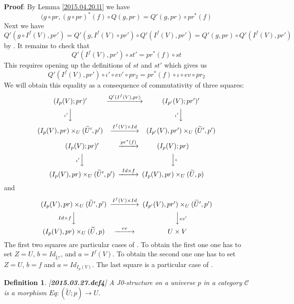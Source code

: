 \documentclass[12pt]{article}
\newenvironment{myproof}{{\bf Proof}:}{\vskip 5mm }
\newtheorem{definition}[proposition]{Definition}
\newcommand{\llabel}[1]{\label{#1}[{\bf #1}]}
\newcommand{\sr}{\rightarrow}
\newcommand{\wt}{\widetilde}
\begin{document}
\begin{myproof}
By Lemma \ref{2015.04.20.l1} we have 
%
$$(g\circ pr, (g\circ pr)^*(f)\circ Q(g,pr)=Q'(g,pr)\circ pr^*(f)$$
%
Next we have
%
$$Q'(g\circ I^f(V), pr')=Q'(g,I^f(V)\circ pr')\circ Q'(I^f(V),pr')=Q'(g,pr)\circ Q'(I^f(V),pr')$$
%
by \cite[Lemma 2.5]{Cfromauniverse}. It remains to check that
%
$$Q'(I^f(V),pr')\circ st'=pr^*(f)\circ st$$
%
This requires opening up the definitions of $st$ and $st'$ which gives us
%
$$Q'(I^f(V),pr')\circ \iota'\circ ev'\circ pr_2=pr^*(f)\circ \iota\circ ev\circ pr_2$$
%
We will obtain this equality as a consequence of commutativity of three squares:
%
$$
\begin{CD}
(I_p(V);pr)' @>Q'(I^f(V),pr)>> (I_{p'}(V);pr')'\\
@V\iota' VV @V\iota' VV\\
(I_p(V),pr)\times_U(\wt{U}',p') @>I^f(V)\times Id>> (I_{p'}(V),pr')\times_U(\wt{U}',p')
\end{CD}
$$
%
$$
\begin{CD}
(I_p(V);pr)'  @>pr^*(f)>> (I_p(V);pr)\\
@V\iota' VV @VV\iota V\\
(I_p(V),pr)\times_U(\wt{U}',p') @>Id\times f >> (I_p(V),pr)\times_U(\wt{U},p)
\end{CD}
$$
%
and
%
$$
\begin{CD}
(I_p(V),pr)\times_U(\wt{U}',p') @>I^f(V)\times Id >> (I_{p'}(V),pr')\times_U(\wt{U}',p')\\
@VId\times f VV @VV {ev'}V\\
(I_p(V),pr)\times_U(\wt{U},p) @>ev>> U\times V
\end{CD}
$$
%
The first two squares are particular cases of \cite[Lemma 8.1]{fromunivwithPi}. To obtain the first one one has to set $Z=U$, $b=Id_{\wt{U}'}$, and $a=I^f(V)$. To obtain the second one one has to set $Z=U$, $b=f$ and $a=Id_{I_p(V)}$. The last square is a particular case of \cite[Lemma 8.6]{fromunivwithPi}.
%
\end{myproof}
%
\begin{definition}
\llabel{2015.03.27.def4}
A J0-structure on a universe $p$ in a category $\mathcal C$ is a morphism $Eq:(\wt{U};p)\sr U$.
\end{definition}
%
\end{document}
